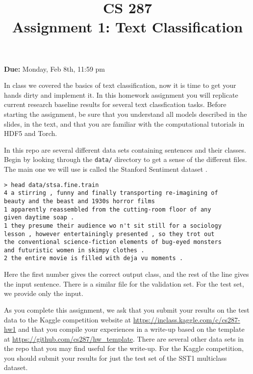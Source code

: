 \documentclass[11pt]{article}
\title{CS 287 \\ Assignment 1: Text Classification }
\date{}
\begin{document}
\maketitle{}

\begin{center}
  \textbf{Due:} Monday, Feb 8th, 11:59 pm 
\end{center}


In class we covered the basics of text classification, now it is time
to get your hands dirty and implement it.  In this homework assignment
you will replicate current research baseline results for several text
classfication tasks. Before starting the assignment, be sure that you
understand all models described in the slides, in the text, and that
you are familiar with the computational tutorials in HDF5 and Torch.


In this repo are several different data sets containing sentences and 
their classes. Begin by looking through the \texttt{data/} directory 
to get a sense of the different files. The main one we will use is 
called the Stanford Sentiment dataset \citep{socher2013recursive}.


\begin{verbatim}
> head data/stsa.fine.train
4 a stirring , funny and finally transporting re-imagining of 
beauty and the beast and 1930s horror films
1 apparently reassembled from the cutting-room floor of any 
given daytime soap .
1 they presume their audience wo n't sit still for a sociology 
lesson , however entertainingly presented , so they trot out 
the conventional science-fiction elements of bug-eyed monsters 
and futuristic women in skimpy clothes .
2 the entire movie is filled with deja vu moments .
\end{verbatim}

Here the first number gives the correct output class, and the rest of
the line gives the input sentence. There is a similar file for the
validation set. For the test set, we provide only the input. 

As you complete this assignment, we ask that you submit your results
on the test data to the Kaggle competition website at
\url{https://inclass.kaggle.com/c/cs287-hw1} and that you compile your
experiences in a write-up based on the template at
\url{https://github.com/cs287/hw_template}. There are 
several other data sets in the repo that you may find useful for the 
write-up. For the Kaggle competition, you should submit your results 
for just the test set of the SST1 multiclass dataset.
 
\end{document}

